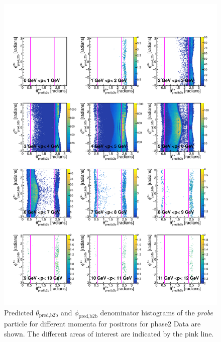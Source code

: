 \documentclass[a4paper,11pt,twosided,final,german,openbib,pdftex,listof=totoc,bibliography=totoc]{scrbook}
\begin{document}
\begin{appendix}
\begin{figure}[h!]
	\includegraphics[width=\textwidth]{Plots/master/RTPMepD_Data.pdf}
	\caption[Denominator $\theta_{\textrm{pred,b2b}}$-$\phi_{\textrm{pred,b2b}}$ Positron Momentum Phase2 Data]{Predicted $\theta_{\textrm{pred,b2b}}$ and $\phi_{\textrm{pred,b2b}}$ denominator histograms of the \textit{probe} particle for different momenta for positrons for phase2 Data are shown. The different areas of interest are indicated by the pink line.}
	\label{plt:RTPMepD_Data}
\end{figure}



\end{appendix}
\end{document}
